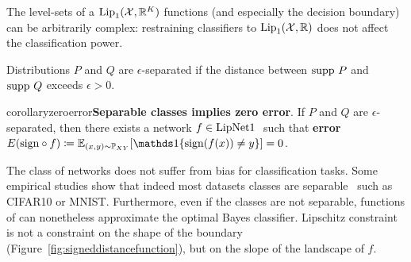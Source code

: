     The level-sets of a $\text{Lip}_1(\mathcal{X},\mathbb{R}^K)$ functions (and especially the decision boundary) can be arbitrarily complex: restraining classifiers to $\text{Lip}_1(\mathcal{X},\mathbb{R})$ does not affect the classification power. %
    \begin{definition}
    Distributions $P$ and $Q$ are $\epsilon$-separated if the distance between $\text{supp }P$ and $\text{supp }Q$ exceeds $\epsilon>0$.
    \end{definition}
    \begin{restatable}{corollary}{zeroerror}{\normalfont\textbf{Separable classes implies zero error}.}\label{thm:zeroerror}
        If $P$ and $Q$ are $\epsilon$-separated, then there exists a network $f\in\text{LipNet1 }$ such that \textbf{error} $E(\sign\circ f)\coloneqq\Expect_{(x,y)\sim\Prob_{XY}}[\indicator\{\sign(f(x))\neq y\}]=0$.  
    \end{restatable} %
    
      The class of \LipCl networks does not suffer from bias for classification tasks. Some empirical studies show that indeed most datasets classes are separable~\cite{yang2020closer} such as CIFAR10 or MNIST. Furthermore, even if the classes are not separable, functions of \LipCl can nonetheless approximate the optimal Bayes classifier. Lipschitz constraint is not a constraint on the shape of the boundary (Figure~\ref{fig:signeddistancefunction}), but on the slope of the landscape of $f$. 
     
    
